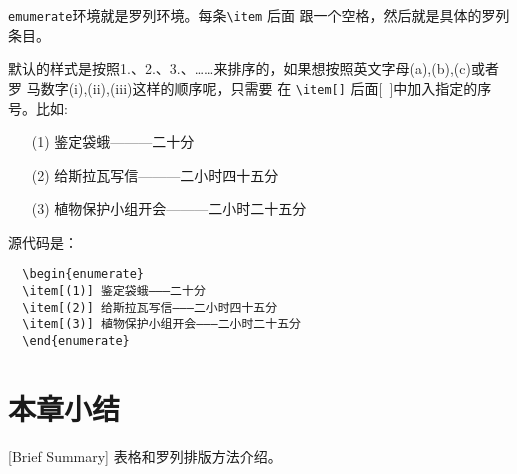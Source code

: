 \texttt{emumerate}环境就是罗列环境。每条\verb|\item| 后面
跟一个空格，然后就是具体的罗列条目。

默认的样式是按照1.、2.、3.、……来排序的，如果想按照英文字母(a),(b),(c)或者罗
马数字(i),(ii),(iii)这样的顺序呢，只需要
在 \verb|\item[]| 后面[~]中加入指定的序号。比如:
\begin{enumerate}
  \item[(1)] 鉴定袋蛾———二十分
  \item[(2)] 给斯拉瓦写信———二小时四十五分
  \item[(3)] 植物保护小组开会———二小时二十五分
\end{enumerate}
源代码是：
\begin{lstlisting}
  \begin{enumerate}
  \item[(1)] 鉴定袋蛾———二十分
  \item[(2)] 给斯拉瓦写信———二小时四十五分
  \item[(3)] 植物保护小组开会———二小时二十五分
  \end{enumerate}
\end{lstlisting}

\section*{本章小结}[Brief Summary]
表格和罗列排版方法介绍。

